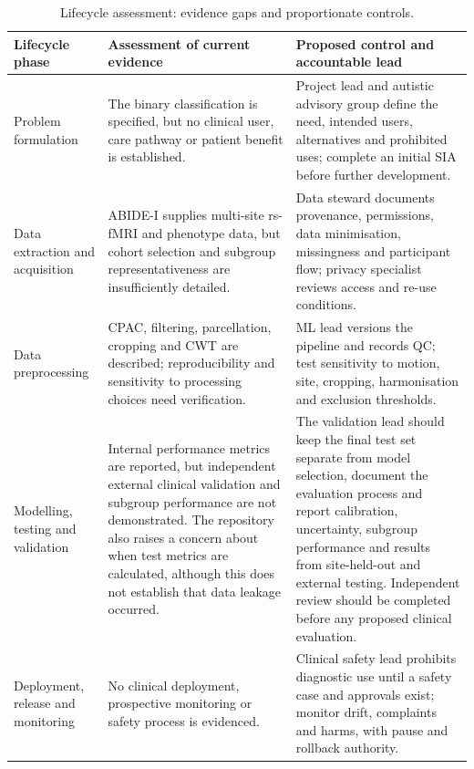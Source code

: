 \documentclass[11pt,a4paper]{article}
\begin{document}
\begin{table}[H]
\centering
\caption{Lifecycle assessment: evidence gaps and proportionate controls.}
\label{tab:lifecycle}
\small
\begin{tabularx}{\textwidth}{p{2.5cm}Y Y}
\toprule
\textbf{Lifecycle phase} & \textbf{Assessment of current evidence} & \textbf{Proposed control and accountable lead}\\
\midrule
Problem formulation & The binary classification is specified, but no clinical user, care pathway or patient benefit is established. & Project lead and autistic advisory group define the need, intended users, alternatives and prohibited uses; complete an initial SIA before further development.\\
Data extraction and acquisition & ABIDE-I supplies multi-site rs-fMRI and phenotype data, but cohort selection and subgroup representativeness are insufficiently detailed. & Data steward documents provenance, permissions, data minimisation, missingness and participant flow; privacy specialist reviews access and re-use conditions.\\
Data preprocessing & CPAC, filtering, parcellation, cropping and CWT are described; reproducibility and sensitivity to processing choices need verification. & ML lead versions the pipeline and records QC; test sensitivity to motion, site, cropping, harmonisation and exclusion thresholds.\\
Modelling, testing and validation & Internal performance metrics are reported, but independent external clinical validation and subgroup performance are not demonstrated. The repository also raises a concern about when test metrics are calculated, although this does not establish that data leakage occurred. & The validation lead should keep the final test set separate from model selection, document the evaluation process and report calibration, uncertainty, subgroup performance and results from site-held-out and external testing. Independent review should be completed before any proposed clinical evaluation.\\
Deployment, release and monitoring & No clinical deployment, prospective monitoring or safety process is evidenced. & Clinical safety lead prohibits diagnostic use until a safety case and approvals exist; monitor drift, complaints and harms, with pause and rollback authority.\\
\bottomrule
\end{tabularx}
\end{table}
\end{document}
